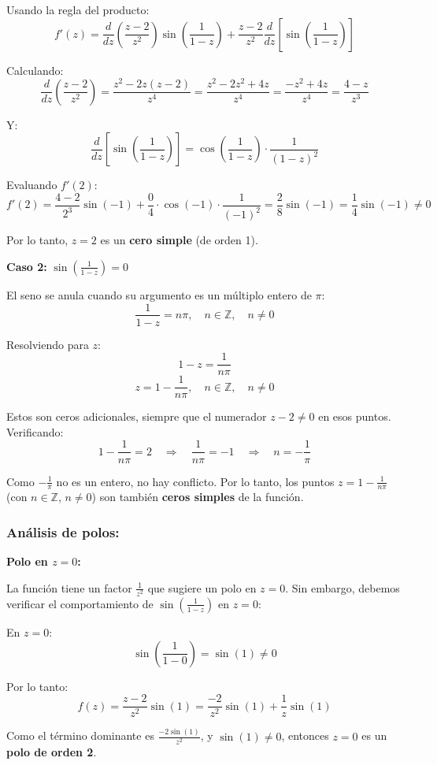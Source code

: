 \documentclass{article}
\begin{document}
Usando la regla del producto:
$$f'(z) = \frac{d}{dz}\left(\frac{z - 2}{z^2}\right) \sin\left(\frac{1}{1 - z}\right) + \frac{z - 2}{z^2} \frac{d}{dz}\left[\sin\left(\frac{1}{1 - z}\right)\right]$$

Calculando:
$$\frac{d}{dz}\left(\frac{z - 2}{z^2}\right) = \frac{z^2 - 2z(z - 2)}{z^4} = \frac{z^2 - 2z^2 + 4z}{z^4} = \frac{-z^2 + 4z}{z^4} = \frac{4 - z}{z^3}$$

Y:
$$\frac{d}{dz}\left[\sin\left(\frac{1}{1 - z}\right)\right] = \cos\left(\frac{1}{1 - z}\right) \cdot \frac{1}{(1 - z)^2}$$

Evaluando $f'(2)$:
$$f'(2) = \frac{4 - 2}{2^3} \sin(-1) + \frac{0}{4} \cdot \cos(-1) \cdot \frac{1}{(-1)^2} = \frac{2}{8} \sin(-1) = \frac{1}{4}\sin(-1) \neq 0$$

Por lo tanto, $z = 2$ es un \textbf{cero simple} (de orden 1).

\textbf{Caso 2:} $\sin\left(\frac{1}{1 - z}\right) = 0$

El seno se anula cuando su argumento es un múltiplo entero de $\pi$:
$$\frac{1}{1 - z} = n\pi, \quad n \in \mathbb{Z}, \quad n \neq 0$$

Resolviendo para $z$:
$$1 - z = \frac{1}{n\pi}$$
$$z = 1 - \frac{1}{n\pi}, \quad n \in \mathbb{Z}, \quad n \neq 0$$

Estos son ceros adicionales, siempre que el numerador $z - 2 \neq 0$ en esos puntos. Verificando:
$$1 - \frac{1}{n\pi} = 2 \quad \Rightarrow \quad \frac{1}{n\pi} = -1 \quad \Rightarrow \quad n = -\frac{1}{\pi}$$

Como $-\frac{1}{\pi}$ no es un entero, no hay conflicto. Por lo tanto, los puntos $z = 1 - \frac{1}{n\pi}$ (con $n \in \mathbb{Z}$, $n \neq 0$) son también \textbf{ceros simples} de la función.

\subsubsection*{Análisis de polos:}

\textbf{Polo en $z = 0$:}

La función tiene un factor $\frac{1}{z^2}$ que sugiere un polo en $z = 0$. Sin embargo, debemos verificar el comportamiento de $\sin\left(\frac{1}{1 - z}\right)$ en $z = 0$:

En $z = 0$:
$$\sin\left(\frac{1}{1 - 0}\right) = \sin(1) \neq 0$$

Por lo tanto:
$$f(z) = \frac{z - 2}{z^2} \sin(1) = \frac{-2}{z^2} \sin(1) + \frac{1}{z} \sin(1)$$

Como el término dominante es $\frac{-2\sin(1)}{z^2}$, y $\sin(1) \neq 0$, entonces $z = 0$ es un \textbf{polo de orden 2}.
\end{document}
